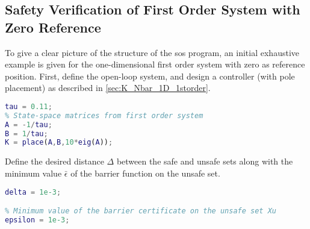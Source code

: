 \subsection{Safety Verification of First Order System with Zero Reference}\label{subsec:zeroref}
To give a clear picture of the structure of the \gls{sos} program, an initial exhaustive example is given for the  one-dimensional first order system with zero as reference position.
First, define the open-loop system, and design a controller (with pole placement) as described in \autoref{sec:K_Nbar_1D_1storder}.
\begin{lstlisting}[language=matlab]
% Time constant from measurement
tau = 0.11;
% State-space matrices from first order system
A = -1/tau;
B = 1/tau;
K = place(A,B,10*eig(A));
\end{lstlisting}
Define the desired distance $\Delta$ between the safe and unsafe sets along with  the minimum value $\bar{\epsilon}$ of the barrier function on the unsafe set. %
\begin{lstlisting}[language=matlab]
% Distance between defined safe and unsafe regions
delta = 1e-3;

% Minimum value of the barrier certificate on the unsafe set Xu
epsilon = 1e-3;
\end{lstlisting}

